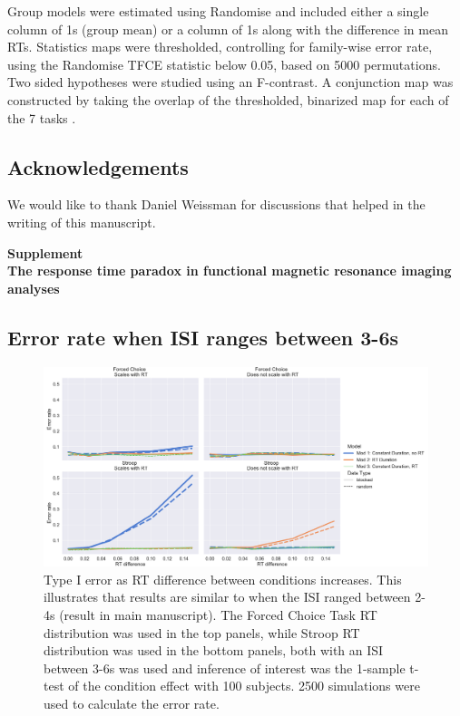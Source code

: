 \documentclass[titlepage,12pt] {article}
\newcommand{\beginsupplement}{%
        \setcounter{table}{0}
        \renewcommand{\thetable}{S\arabic{table}}%
        \setcounter{figure}{0}
        \renewcommand{\thefigure}{S\arabic{figure}}%
     }
\begin{document}
Group models were estimated using Randomise \citep{smith2009} and included either a single column of 1s (group mean) or a column of 1s along with the difference in mean RTs. Statistics maps were thresholded, controlling for family-wise error rate, using the Randomise TFCE statistic below 0.05, based on 5000 permutations.  Two sided hypotheses were studied using an F-contrast.  A conjunction map was constructed by taking the overlap of the thresholded, binarized map for each of the 7 tasks \citep{nichols_valid_2005}.


\subsection*{Acknowledgements}
We would like to thank Daniel Weissman for discussions that helped in the writing of this manuscript.




\newpage
\beginsupplement

\begin{center}
{\large\textbf{Supplement \\ The response time paradox in functional magnetic resonance imaging analyses
}}
\end{center}


\subsection*{Error rate when ISI ranges between 3-6s}
\begin{figure}[h!]
  \centering
   \includegraphics[width=5in]{Figures/type1_err_36.pdf}
   \caption{Type I error as RT difference between conditions increases.  This illustrates that results are similar to when the ISI ranged between 2-4s (result in main manuscript).  The Forced Choice Task RT distribution was used in the top panels, while Stroop RT distribution was used in the bottom panels, both with an ISI between 3-6s was used and inference of interest was the 1-sample t-test of the condition effect with 100 subjects.  2500 simulations were used to calculate the error rate.}
  \label{fig:type1err_36}
\end{figure}
\end{document}
